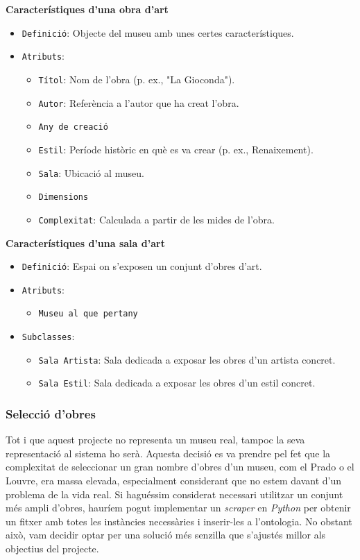 \documentclass[a4paper]{article}
\begin{document}
	
	\noindent \textbf{Característiques d'una obra d'art}
	\begin{itemize}
		\item \texttt{Definició}: Objecte del museu amb unes certes característiques.
		\item \texttt{Atributs}:
			\begin{itemize}
				\item \texttt{Títol}: Nom de l’obra (p. ex., "La Gioconda").
				\item \texttt{Autor}: Referència a l’autor que ha creat l'obra.
				\item \texttt{Any de creació}
				\item \texttt{Estil}: Període històric en què es va crear (p. ex., Renaixement).
				\item \texttt{Sala}: Ubicació al museu.
				\item \texttt{Dimensions}
				\item \texttt{Complexitat}: Calculada a partir de les mides de l'obra.
			\end{itemize}
	\end{itemize}


	\noindent \textbf{Característiques d'una sala d'art}
	\begin{itemize}
		\item \texttt{Definició}: Espai on s'exposen un conjunt d'obres d'art.
		\item \texttt{Atributs}:
		\begin{itemize}
			\item \texttt{Museu al que pertany}
		\end{itemize}
		\item \texttt{Subclasses}:
		\begin{itemize}
			\item \texttt{Sala Artista}: Sala dedicada a exposar les obres d'un artista concret.
			\item \texttt{Sala Estil}: Sala dedicada a exposar les obres d'un estil concret.
		\end{itemize}
	\end{itemize}
	
	\subsubsection{Selecció d'obres}
	
	Tot i que aquest projecte no representa un museu real, tampoc la seva representació al sistema ho serà. Aquesta decisió es va prendre pel fet que la complexitat de seleccionar un gran nombre d'obres d'un museu, com el Prado o el Louvre, era massa elevada, especialment considerant que no estem davant d'un problema de la vida real. Si haguéssim considerat necessari utilitzar un conjunt més ampli d'obres, hauríem pogut implementar un \textit{scraper} en \textit{Python} per obtenir un fitxer amb totes les instàncies necessàries i inserir-les a l'ontologia. No obstant això, vam decidir optar per una solució més senzilla que s'ajustés millor als objectius del projecte.\\
	
\end{document}
